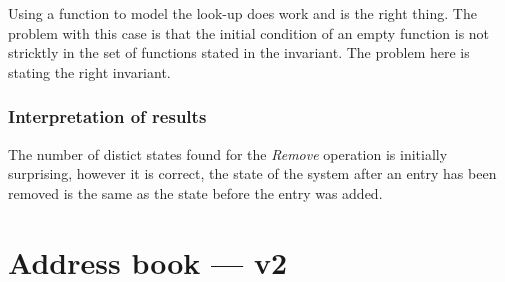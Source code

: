 \documentclass[12pt]{article}
\begin{document}
\begin{infobox}{\tricky}
Using a function to model the look-up does work and is the right thing.
The problem with this case is that the initial condition of an empty function
is not stricktly in the set of functions stated in the invariant.
The problem here is stating the right invariant.
\end{infobox}

\subsubsection{Interpretation of results}
The number of distict states found for the \textit{Remove} operation is
initially surprising, however it is correct, the state of the system after an
entry has been removed is the same as the state before the entry was added.

\clearpage

\section{Address book --- v2}
\end{document}
